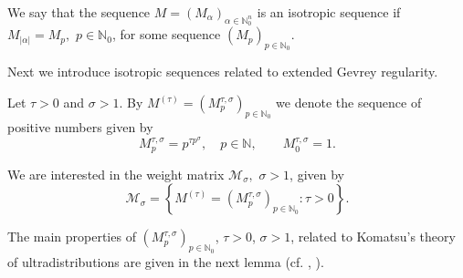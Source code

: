 \documentclass{article}
\theoremstyle{thmstyleone}
\theoremstyle{thmstyletwo}%
\theoremstyle{thmstylethree}%
\begin{document}
We say that the sequence $M = ( M_{\alpha})_{\alpha\in \mathbb N_0 ^n}$ 
is an isotropic sequence if 
$  M_{|\alpha|} = M_{p}, $  $p\in\mathbb N_0$, for some sequence
$ ( M_{p})_{p\in\mathbb N_0} $.

\par 

Next we introduce isotropic sequences related to extended Gevrey regularity.



Let $\tau>0$ and $\sigma>1.$ By  $M^{(\tau)} = 
(M_{p}^{\tau,\sigma})_{p\in\mathbb N_0}$ we denote 
 the sequence of positive numbers given by
\begin{equation} \label{eq:the-sequence}
    M_{p}^{\tau,\sigma}=p^{\tau p^\sigma},\quad p\in \mathbb{N},
     \qquad M_0^{\tau,\sigma}=1.
\end{equation}

\par

We are interested in  the weight matrix $\mathcal{M}_\sigma,$ $\sigma>1$, given by
    \begin{equation}\label{eq:the-weight-matrix}
\mathcal{M}_\sigma=\left\{M^{(\tau)} =  (M_{p}^{\tau,\sigma})_{p\in\mathbb N_0}\colon \tau>0\right\}.
    \end{equation}

\par


The main properties of $(M_{p}^{\tau,\sigma})_{p\in\mathbb N_0}$,
$\tau>0$, $\sigma>1$, related to Komatsu's theory of ultradistributions
are given in the next lemma (cf. \cite[Lemmas 2.2 and 3.1]{PTT-01}, 
\cite[Lemma 2]{TTZ2024}).
\end{document}
